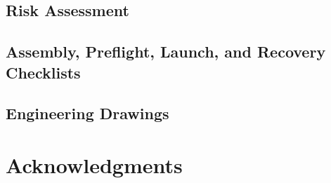 \documentclass[conf]{lib/new-aiaa}
\begin{document}
\begin{quotation}
\HazardAnalysisDescription{}
\end{quotation}

\subsection{Risk Assessment}

\begin{quotation}
\RiskAssessmentDescription{}
\end{quotation}

\subsection{Assembly, Preflight, Launch, and Recovery Checklists}

\begin{quotation}
\ChecklistsDescription{}
\end{quotation}

\subsection{Engineering Drawings}

\begin{quotation}
\DrawingsDescription{}
\end{quotation}

\section*{Acknowledgments}

% 
\end{document}
